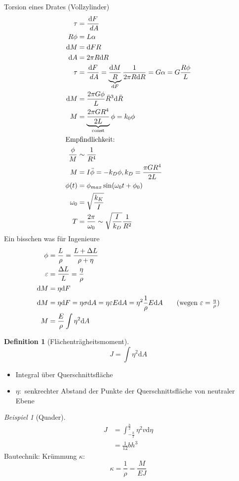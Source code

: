 \documentclass[a4paper]{scrartcl}
\renewcommand{\d}{\mathrm{d}}
\newcommand{\dd}[2]{\frac{\d #1}{\ d#2}}
\theoremstyle{definition}
\newtheorem{defn}{Definition}
\theoremstyle{plain}
\theoremstyle{plain}
\theoremstyle{remark}
\theoremstyle{remark}
\theoremstyle{remark}
\newtheorem{ex}{Beispiel}
\newcommand{\eps}{\ensuremath{\varepsilon}}%
\begin{document}
Torsion eines Drates (Vollzylinder)
\begin{align*}
\tau &= \dd{F}{A} \\
R \phi &= L \alpha \\
\d M &= \d F R \\
\d A &= 2\pi R \d R \\
\tau &= \dd{F}{A} = \underbrace{\frac{\d M}{R}}_{\d F} \frac{1}{2\pi R \d R} = G \alpha = G \frac{R \phi}{L} \\
\d M &= \frac{2\pi G \phi}{L} \bar R^3 \d \bar R \\
M &= \underbrace{\frac{2\pi G R^4}{2 L}}_{\text{const}} \phi = k_0 \phi \\
\intertext{Empfindlichkeit:}
\frac{\phi}{M} &\sim \frac{1}{R^4} \\
M &= I \ddot{\phi} = -k_D \phi, k_D = \frac{\pi G R^4}{2L} \\
\phi(t) &= \phi_{max} \sin(\omega_0 t + \phi_0) \\
\omega_0 &= \sqrt{\frac{k_K}{I}} \\
T &= \frac{2\pi}{\omega_0} \sim \sqrt{\frac{I}{k_D}} \frac{1}{R^2} \\
\end{align*}
Ein bisschen was für Ingenieure
\begin{align*}
\phi &= \frac{L}{\rho} = \frac{L + \Delta L}{\rho + \eta} \\
\eps &= \frac{\Delta L}{L} = \frac{\eta}{\rho} \\
\d M &= \eta \d F \\
\d M &= \eta \d F = \eta \sigma \d A = \eta \eps E \d A = \eta^2 \frac{1}{\rho} E \d A \tag{wegen $\eps = \frac{\eta}{\rho}$}\\
M &= \frac{E}{\rho} \int \eta^2 \d A
\end{align*}
\begin{defn}[Flächenträgheitsmoment]
\[J = \int \eta^2 \d A\]
\begin{itemize}
\item Integral über Querschnittsfläche
\item $\eta:$ senkrechter Abstand der Punkte der Querschnittsfläche von neutraler Ebene
\end{itemize}
\end{defn}
\begin{ex}[Quader]
\begin{align*}
J &= \int_{-\frac{h}{2}}^{\frac{h}{2}} \eta^2 v \d\eta \\
&= \frac{1}{12} b h^3
\end{align*}
Bautechnik:
Krümmung $\kappa$:
\[\kappa = \frac{1}{\rho} = \frac{M}{E J}\]
\end{ex}
\end{document}
